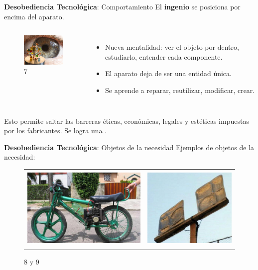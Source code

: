 \documentclass[spanish]{beamer}
\begin{document}
\begin{frame}{\textbf{Desobediencia Tecnológica}: Comportamiento}
    El \textbf{ingenio} se posiciona por encima del aparato.
    \vspace*{-3mm}
    \begin{columns}
            \begin{figure}
                \centering
                \includegraphics[width=3.5cm]{img/complejidad.jpg}
                \caption{ 7}
            \end{figure}
            \begin{itemize}
                \item Nueva mentalidad: ver el objeto por dentro, estudiarlo, entender cada componente.
                \item El aparato deja de ser una entidad única.
                \item Se aprende a reparar, reutilizar, modificar, crear.
            \end{itemize}
    \end{columns}
    \vspace{0.3cm}
    Esto permite saltar las barreras éticas, económicas, legales y estéticas impuestas por los fabricantes.
    Se logra una .
\end{frame}

\begin{frame}{\textbf{Desobediencia Tecnológica}: Objetos de la necesidad}
    Ejemplos de objetos de la necesidad:

    \begin{figure}
        \begin{tabular}{cc}
            \includegraphics[height=4cm]{img/inventos/rikimbili.jpg}& \includegraphics[height=4cm]{img/inventos/antena_bandejas.jpg} \\
        \end{tabular}
        \caption{8 y 9}
    \end{figure}

\end{frame}
\end{document}

